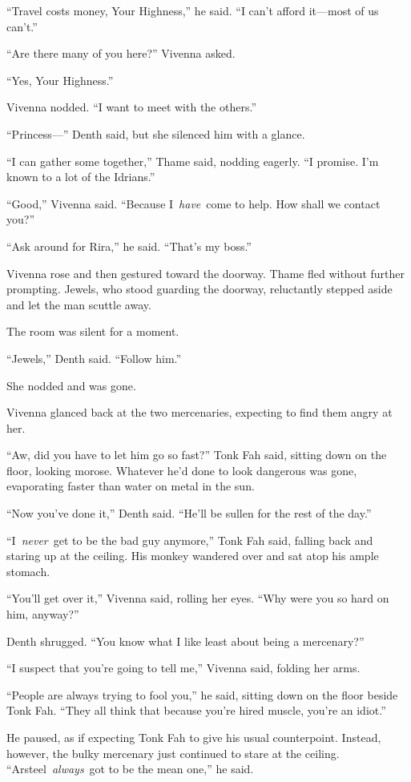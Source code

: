 “Travel costs money, Your Highness,” he said. “I can’t afford it—most of us can’t.”

“Are there many of you here?” Vivenna asked.

“Yes, Your Highness.”

Vivenna nodded. “I want to meet with the others.”

“Princess—” Denth said, but she silenced him with a glance.

“I can gather some together,” Thame said, nodding eagerly. “I promise. I’m known to a lot of the Idrians.”

“Good,” Vivenna said. “Because I~\textit{have}~come to help. How shall we contact you?”

“Ask around for Rira,” he said. “That’s my boss.”

Vivenna rose and then gestured toward the doorway. Thame fled without further prompting. Jewels, who stood guarding the doorway, reluctantly stepped aside and let the man scuttle away.

The room was silent for a moment.

“Jewels,” Denth said. “Follow him.”

She nodded and was gone.

Vivenna glanced back at the two mercenaries, expecting to find them angry at her.

“Aw, did you have to let him go so fast?” Tonk Fah said, sitting down on the floor, looking morose. Whatever he’d done to look dangerous was gone, evaporating faster than water on metal in the sun.

“Now you’ve done it,” Denth said. “He’ll be sullen for the rest of the day.”

“I~\textit{never}~get to be the bad guy anymore,” Tonk Fah said, falling back and staring up at the ceiling. His monkey wandered over and sat atop his ample stomach.

“You’ll get over it,” Vivenna said, rolling her eyes. “Why were you so hard on him, anyway?”

Denth shrugged. “You know what I like least about being a mercenary?”

“I suspect that you’re going to tell me,” Vivenna said, folding her arms.

“People are always trying to fool you,” he said, sitting down on the floor beside Tonk Fah. “They all think that because you’re hired muscle, you’re an idiot.”

He paused, as if expecting Tonk Fah to give his usual counterpoint. Instead, however, the bulky mercenary just continued to stare at the ceiling. “Arsteel~\textit{always}~got to be the mean one,” he said.

